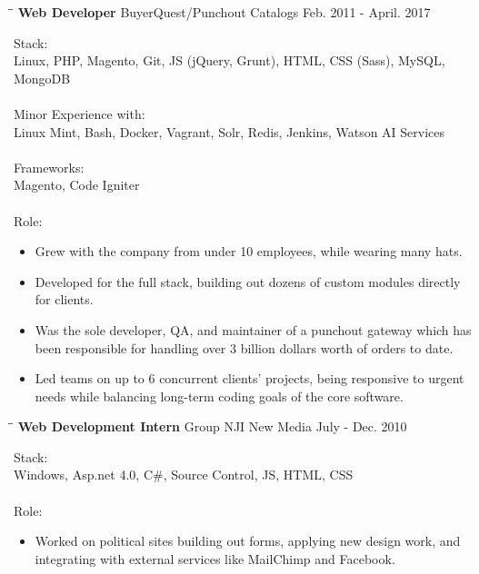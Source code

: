 \documentclass{res}
\begin{document}
\begin{resume}
   
   \begin{tabbing}
   		\hspace{2.0in}\= \hspace{2.7in}\= \kill %
    	\textbf{Web Developer} \>BuyerQuest/Punchout Catalogs     \>Feb. 2011 - April. 2017\\
   \end{tabbing}\vspace{-20pt}      %
   
    Stack: \\
	Linux, PHP, Magento, Git, JS (jQuery, Grunt), HTML, CSS (Sass), MySQL, MongoDB \\
	\\
	Minor Experience with: \\
	Linux Mint, Bash, Docker, Vagrant, Solr, Redis, Jenkins, Watson AI Services \\
	\\
	Frameworks: \\
	Magento, Code Igniter \\
	\\
	Role: \\
	\vspace{-0.15in}	
	\begin{itemize}
		\item Grew with the company from under 10 employees, while wearing many hats.
		\item Developed for the full stack, building out dozens of custom modules directly for clients.
		\item Was the sole developer, QA, and maintainer of a punchout gateway which has been responsible for handling over 3 billion dollars worth of orders to date.
		\item Led teams on up to 6 concurrent clients' projects, being responsive to urgent needs while balancing long-term coding goals of the core software.
	\end{itemize}
	
	
	\begin{tabbing}
		\hspace{2.3in}\= \hspace{2.6in}\= \kill %
		\textbf{Web Development Intern} \>Group NJI New Media \> July - Dec. 2010 \\
   \end{tabbing}\vspace{-20pt}
   
    Stack: \\
	Windows, Asp.net 4.0, C\#, Source Control, JS, HTML, CSS \\
	\\
	Role: \\
	\vspace{-0.15in}
	\begin{itemize}
		\item Worked on political sites building out forms, applying new design work, and integrating with external services like MailChimp and Facebook.
	\end{itemize}
	

\end{resume}
\end{document}
